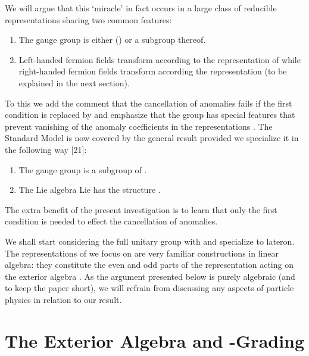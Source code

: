 \documentclass[11pt,a4paper]{article}
\providecommand{\CC}{\mathbb{C}}
\providecommand{\ZZ}{\mathbb{Z}}
\providecommand{\bw}{{\textstyle\bigwedge}}
\begin{document}
We will argue that this `miracle' in fact occurs in a large class
of reducible representations sharing two common features:
\begin{enumerate}
\item The gauge group \coordHE{} is either \coordHE{} (\coordHE{}) or a subgroup thereof.
\item Left-handed fermion fields transform according to the representation 
      \myHighlight{$\bw^-$}\coordHE{} of \coordHE{} while right-handed fermion fields transform according 
      the representation \myHighlight{$\bw^+$}\coordHE{} (to be explained in the next section).
\end{enumerate}
To this we add the comment that the cancellation of anomalies fails if the
first condition is replaced by \coordHE{} and emphasize that the group \coordHE{} 
has special features that prevent vanishing of the
anomaly coefficients in the representations \myHighlight{$\bw^\pm$}\coordHE{}.
The Standard Model is now covered by the general result provided we
specialize it in the following way [21]:
\begin{enumerate}
\item The gauge group \coordHE{} is a subgroup of \coordHE{}.
\item The Lie algebra Lie\coordHE{} has the structure \coordHE{}.
\end{enumerate}
The extra benefit of the present investigation is to learn that only the first 
condition is needed to effect the cancellation of anomalies.

We shall start considering the full unitary group \coordHE{} with \coordHE{} 
and specialize to \coordHE{} lateron.
The representations \myHighlight{$\bw^\pm u$}\coordHE{} of \coordHE{} we focus on are very familiar 
constructions in linear algebra: they constitute the even and odd parts
of the representation \myHighlight{$\bw u$}\coordHE{} acting on the exterior algebra \myHighlight{$\bw\CC^n$}\coordHE{}. 
As the argument presented below is purely algebraic (and to keep the paper 
short), we will refrain from discussing any aspects of particle physics in
relation to our result.

\section{The Exterior Algebra and \myHighlight{$\ZZ_2$}\coordHE{}-Grading}
\end{document}
